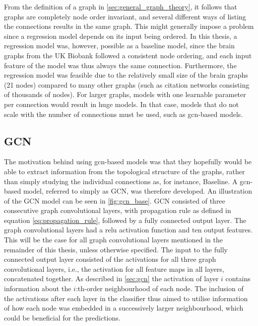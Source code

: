 From the definition of a graph in \cref{sec:general_graph_theory}, it follows that graphs are completely node order invariant, and several different ways of listing the connections results in the same graph. This might generally impose a problem since a regression model depends on its input being ordered. In this thesis, a regression model was, however, possible as a baseline model, since the brain graphs from the UK Biobank followed a consistent node ordering, and each input feature of the model was thus always the same connection. Furthermore, the regression model was feasible due to the relatively small size of the brain graphs (21 nodes) compared to many other graphs (such as citation networks consisting of thousands of nodes). For larger graphs, models with one learnable parameter per connection would result in huge models. In that case, models that do not scale with the number of connections must be used, such as \acrshort{gcn}-based models. 

%         

\subsection{GCN}

The motivation behind using \acrshort{gcn}-based models was that they hopefully would be able to extract information from the topological structure of the graphs, rather than simply studying the individual connections as, for instance, Baseline. A \acrshort{gcn}-based model, referred to simply as GCN, was therefore developed. An illustration of the GCN model can be seen in \cref{fig:gcn_base}. GCN consisted of three consecutive graph convolutional layers, with propagation rule as defined in equation \eqref{eq:propagation_rule}, followed by a fully connected output layer. The graph convolutional layers had a \acrfull{relu} activation function and ten output features. This will be the case for all graph convolutional layers mentioned in the remainder of this thesis, unless otherwise specified. The input to the fully connected output layer consisted of the activations for all three graph convolutional layers, i.e., the activation for all feature maps in all layers, concatenated together. As described in \cref{sec:gcn} the activation of layer $i$ contains information about the $i$:th-order neighbourhood of each node. The inclusion of the activations after each layer in the classifier thus aimed to utilise information of how each node was embedded in a successively larger neighbourhood, which could be beneficial for the predictions.

